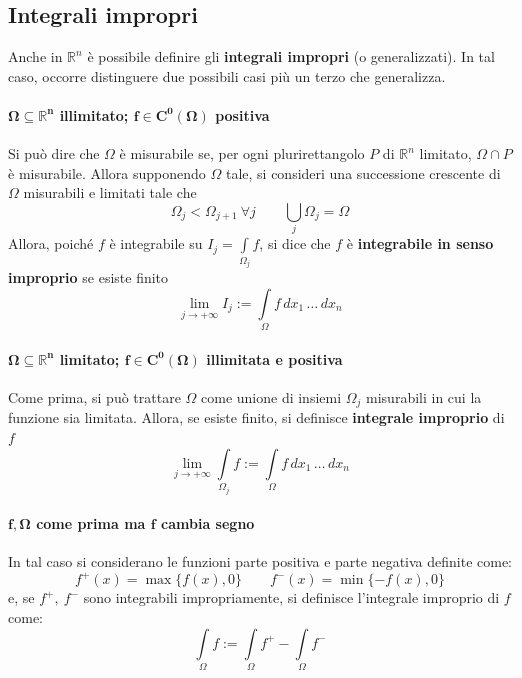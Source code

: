 \subsection{Integrali impropri}
Anche in $\mathbb{R}^n$ è possibile definire gli \textbf{integrali impropri} (o generalizzati). In tal caso, occorre distinguere due possibili casi più un terzo che generalizza.
\paragraph{$\mathbf{\Omega \subseteq \mathbb{R}^n}$ illimitato; $\mathbf{f \in C^0(\Omega)}$ positiva}
Si può dire che $\Omega$ è misurabile se, per ogni plurirettangolo $P$ di $\mathbb{R}^n$ limitato, $\Omega \cap P$ è misurabile. Allora supponendo $\Omega$ tale, si consideri una successione crescente di $\Omega$ misurabili e limitati tale che 
\begin{equation}
 \Omega_j<\Omega_{j+1}\ \forall j \qquad \bigcup\limits_{j}{\Omega_j}=\Omega
\end{equation}
Allora, poiché $f$ è integrabile su $I_j=\int\limits_{\Omega_j}{f}$, si dice che $f$ è \textbf{integrabile in senso improprio} se esiste finito
\begin{equation}
    \lim_{j \to +\infty} I_j := \int\limits_\Omega{f}\,dx_1\, \dots \,dx_n
\end{equation}
\paragraph{$\mathbf{\Omega \subseteq \mathbb{R}^n}$ limitato; $\mathbf{f \in C^0(\Omega)}$ illimitata e positiva} Come prima, si può trattare $\Omega$ come unione di insiemi $\Omega_j$ misurabili in cui la funzione sia limitata. Allora, se esiste finito, si definisce \textbf{integrale improprio} di $f$
\begin{equation}
    \lim_{j \to +\infty} \int\limits_{\Omega_j}f :=    \int\limits_{\Omega} f\,dx_1\, \dots \,dx_n
\end{equation}
\paragraph{$\mathbf{f, \Omega}$ come prima ma $\mathbf{f}$ cambia segno} In tal caso si considerano le funzioni parte positiva e parte negativa definite come:
\begin{equation}
    f^+(x)=\max\{f(x), 0\} \qquad f^-(x)=\min\{-f(x), 0\}
\end{equation}
e, se $f^+,\ f^-$ sono integrabili impropriamente, si definisce l'integrale improprio di $f$ come:
\begin{equation*}
    \int\limits_{\Omega}f := \int\limits_{\Omega} f^+ - \int\limits_{\Omega} f^-
\end{equation*}
